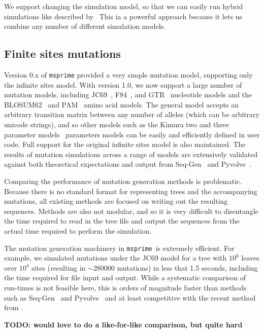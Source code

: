 \documentclass{article}
\newcommand{\msprime}[0]{\texttt{msprime}}
\begin{document}
We support changing the simulation model, so that we can easily
run hybrid simulations like described by~\cite{bhaskar2014distortion}
This ia a powerful approach because it lets us combine any
number of different simulation models.


\subsection{Finite sites mutations}
Version 0.x of \texttt{msprime} provided a very simple mutation model,
supporting only the infinite sites model.
With version 1.0, we now support a large number of mutation models,
including
JC69~\citep{jukes1969evolution},
F84~\citep{felsenstein1996hidden},
and GTR~\citep{tavare1986some} nucleotide models
and the BLOSUM62~\citep{henikoff1992amino}
and PAM~\citep{dayhoff1978} amino acid models.
The general model accepts an arbitrary transition matrix between
any number of alleles (which can be arbitrary unicode strings),
and so other models such as the Kimura two and three
parameter models~\citep{kimura1980simple,kimura1981estimation}
parameters models can be easily
and efficiently defined in user code.
Full support for the original infinite sites model is also maintained.
The results of mutation simulations across a range of models are
extensively validated
against both theoretical expectations and output from
Seq-Gen~\citep{rambaut1997seq} and
Pyvolve~\citep{spielman2015pyvolve}.

Comparing the performance of mutation generation methods is problematic.
Because there is no standard format for representing trees and
the accompanying mutations, all existing methods are focused on
writing out the resulting sequences. Methods are also not modular,
and so it is very difficult to disentangle the time required to
read in the tree file and output the sequences from the actual
time required to perform the simulation.

The mutation generation machinery in \msprime\ is extremely
efficient. For example, we simulated mutations under the JC69
model for a tree with $10^6$ leaves over $10^4$ sites (resulting
in $\sim 280000$ mutations) in less that 1.5 seconds, including
the time required for file input and output. While a systematic
comparison of run-times is not feasible here, this is orders
of magnitude faster than methods such as
Seq-Gen~\citep{rambaut1997seq} and
Pyvolve~\citep{spielman2015pyvolve}
and at least competitive with the recent method from
\cite{demaio2021phastsim}.

\textbf{TODO: would love to do a like-for-like comparison, but quite hard}
\end{document}
